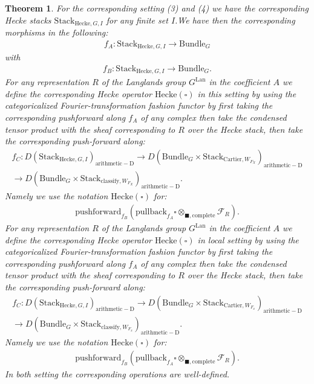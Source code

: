\documentclass[12pt]{book}
\newtheorem{theorem}{Theorem}
\theoremstyle{definition}
\begin{document}
\begin{theorem}
For the corresponding setting (3) and (4) we have the corresponding Hecke stacks $\mathrm{Stack}_{\mathrm{Hecke},G,I}$ for any finite set $I$.We have then the corresponding morphisms in the following:
\begin{align}
f_A: \mathrm{Stack}_{\mathrm{Hecke},G,I} \rightarrow \mathrm{Bundle}_{G}
\end{align}
with
\begin{align}
f_B: \mathrm{Stack}_{\mathrm{Hecke},G,I} \rightarrow \mathrm{Bundle}_{G}.
\end{align}
For any representation $R$ of the Langlands group $G^\mathrm{Lan}$ in the coefficient $A$ we define the corresponding Hecke operator $\mathrm{Hecke}(\square)$ in this setting by using the categoricalized Fourier-transformation fashion functor by first taking the corresponding pushforward along $f_A$ of any complex then take the condensed tensor product with the sheaf corresponding to $R$ over the Hecke stack, then take the corresponding push-forward along:
\begin{align}
f_C: D(\mathrm{Stack}_{\mathrm{Hecke},G,I})_{\mathrm{arithmetic-D}}\rightarrow D(\mathrm{Bundle}_{G}\times \mathrm{Stack}_{\mathrm{Cartier},W_{F_X}})_{\mathrm{arithmetic-D}}\\
 \rightarrow D(\mathrm{Bundle}_{G}\times \mathrm{Stack}_{\mathrm{classify},W_{F_X}})_{\mathrm{arithmetic-D}}.
\end{align}
Namely we use the notation $\mathrm{Hecke}(\square)$ for:
\begin{align}
\mathrm{pushforward}_{f_B}(\mathrm{pullback}_{f_A}\square\otimes_{\blacksquare,\mathrm{complete}}\mathcal{F}_R).
\end{align}
For any representation $R$ of the Langlands group $G^\mathrm{Lan}$ in the coefficient $A$ we define the corresponding Hecke operator $\mathrm{Hecke}(\square)$ in local setting by using the categoricalized Fourier-transformation fashion functor by first taking the corresponding pushforward along $f_A$ of any complex then take the condensed tensor product with the sheaf corresponding to $R$ over the Hecke stack, then take the corresponding push-forward along:
\begin{align}
f_C: D(\mathrm{Stack}_{\mathrm{Hecke},G,I})_{\mathrm{arithmetic-D}} \rightarrow D(\mathrm{Bundle}_{G}\times \mathrm{Stack}_{\mathrm{Cartier},W_{F_x}})_{\mathrm{arithmetic-D}} \\
 \rightarrow D(\mathrm{Bundle}_{G}\times \mathrm{Stack}_{\mathrm{classify},W_{F_x}})_{\mathrm{arithmetic-D}}.
\end{align}
Namely we use the notation $\mathrm{Hecke}(\square)$ for:
\begin{align}
\mathrm{pushforward}_{f_B}(\mathrm{pullback}_{f_A}\square\otimes_{\blacksquare,\mathrm{complete}}\mathcal{F}_R).
\end{align}
In both setting the corresponding operations are well-defined. 
\end{theorem}
\end{document}
